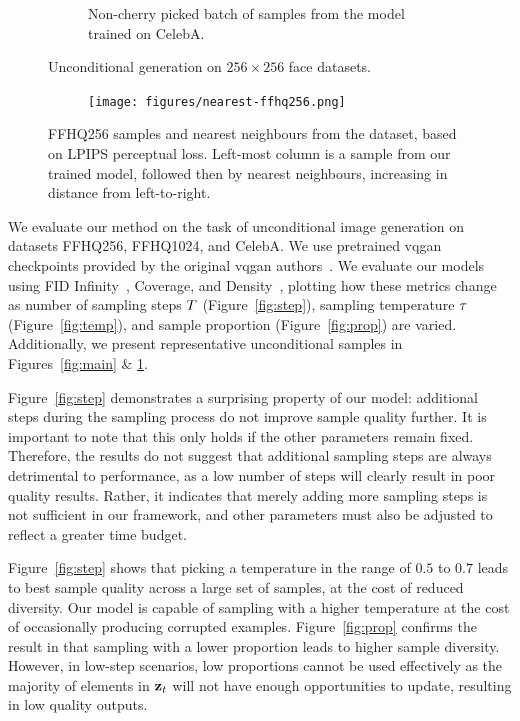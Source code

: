 \begin{figure}
\begin{subfigure}[b]{0.47\textwidth}
        \caption{
            Non-cherry picked batch of samples from the model trained on CelebA.
        }
    \end{subfigure}
    \caption{Unconditional generation on $256 \times 256$ face datasets.}
    \label{fig:face}
\end{figure}

\begin{figure}[ht]
    \centering
    \begin{subfigure}[b]{\textwidth}
        \centering
        \texttt{[image: figures/nearest-ffhq256.png]}
    \end{subfigure}
    \caption{
        FFHQ256 samples and nearest neighbours from the dataset, based on LPIPS
        perceptual loss. Left-most column is a sample from our trained
        model, followed then by nearest neighbours, increasing in distance
        from left-to-right.
    }
\end{figure}

We evaluate our method on the task of unconditional image generation on datasets
FFHQ256, FFHQ1024, and CelebA. We use pretrained \gls{vqgan} checkpoints
provided by the original \gls{vqgan} authors~\cite{esser2021taming}. We evaluate
our models using FID Infinity~\cite{chong2020effectively}, Coverage, and
Density~\cite{ferjad2020icml}, plotting how these metrics change as number of
sampling steps $T$ (Figure~\ref{fig:step}), sampling temperature
$\tau$ (Figure~\ref{fig:temp}), and sample proportion
(Figure~\ref{fig:prop}) are varied. Additionally, we present representative
unconditional samples in Figures~\ref{fig:main} \& \ref{fig:face}.

Figure~\ref{fig:step} demonstrates a surprising property of our model:
additional steps during the sampling process do not improve sample quality
further. It is important to note that this only holds if the other parameters
remain fixed. Therefore, the results do not suggest that additional sampling
steps are always detrimental to performance, as a low number of steps will
clearly result in poor quality results. Rather, it indicates that merely
adding more sampling steps is not sufficient in our framework, and other
parameters must also be adjusted to reflect a greater time budget.

Figure~\ref{fig:step} shows that picking a temperature in the range of $0.5$ to
$0.7$ leads to best sample quality across a large set of samples, at the cost of
reduced diversity. Our model is capable of sampling with a higher temperature at
the cost of occasionally producing corrupted examples. Figure~\ref{fig:prop}
confirms the result in \citet{savinov2022stepunrolled} that sampling with a
lower proportion leads to higher sample diversity. However, in low-step
scenarios, low proportions cannot be used effectively as the majority of
elements in $\mathbf{z}_t$ will not have enough opportunities to update, resulting
in low quality outputs.


